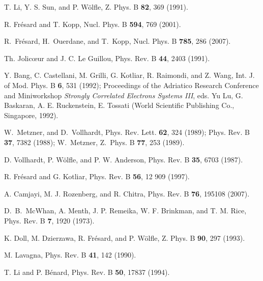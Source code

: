 \documentclass[showpacs,amsmath,twocolumn,floatfix]{revtex4-1}
\begin{document}
\begin{thebibliography}{0}
 T. Li, Y. S. Sun, and P. W\"olfle, 
Z. Phys. B {\bf 82}, 369 (1991).


 R. Fr\'esard and T. Kopp,
                   Nucl. Phys. B \textbf{594}, 769 (2001).

 R.~Fr\'esard, H.~Ouerdane, and T.~Kopp,
                   Nucl. Phys. B \textbf{785}, 286 (2007).

 Th. Jolic{\oe}ur and J. C. Le Guillou,
                   Phys. Rev. B \textbf{44}, 2403 (1991).

 Y. Bang, C. Castellani, M. Grilli, G. Kotliar, R. Raimondi,
                    and Z. Wang,
                    Int. J. of Mod. Phys. B \textbf{6}, 531 (1992);
                    Proceedings of the Adriatico Research Conference and
                    Miniworkshop \textit{Strongly Correlated Electrons Systems
                    III}, eds. Yu Lu, G. Baskaran, A. E. Ruckenstein, E.
                    Tossati (World Scientific Publishing Co., Singapore, 1992).

 W.~Metzner, and D.~Vollhardt,
                    Phys. Rev. Lett. \textbf{62}, 324 (1989);
                    Phys. Rev. B \textbf{37}, 7382 (1988);
                 W.~Metzner,
                    Z.~Phys. B \textbf{77}, 253 (1989).
                    
 D. Vollhardt, P. W\"olfle, and P. W. Anderson,
                    Phys. Rev. B \textbf{35}, 6703 (1987).
                                        

 R. Fr\'esard and G. Kotliar,
                   Phys. Rev. B \textbf{56}, 12 909 (1997).                                        
                                        
 A. Camjayi, M. J. Rozenberg, and R. Chitra, 
                    Phys. Rev. B {\bf 76}, 195108 (2007).
                    
 D.~B.~McWhan, A. Menth, J. P. Remeika, W. F. Brinkman, and T. M. Rice, 
                   Phys. Rev. B \textbf{7}, 1920 (1973).
                   
 K. Doll, M. Dzierzawa, R. Fr\'esard, and P. W\"olfle, 
                 Z. Phys. B {\bf 90}, 297 (1993).

 M. Lavagna,
                    Phys. Rev. B \textbf{41}, 142 (1990).
                        
 T. Li and P. B\'enard, 
               Phys. Rev. B {\bf 50}, 17837 (1994).   
               

\end{thebibliography}
\end{document}
